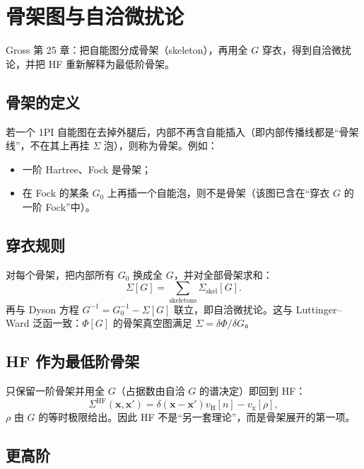 \section{骨架图与自洽微扰论}

Gross 第 25 章：把自能图分成骨架（skeleton），再用全 $G$ 穿衣，得到自洽微扰论，并把 HF 重新解释为最低阶骨架。

\subsection{骨架的定义}

若一个 1PI 自能图在去掉外腿后，内部不再含自能插入（即内部传播线都是“骨架线”，不在其上再挂 $\Sigma$ 泡），则称为骨架。例如：
\begin{itemize}
  \item 一阶 Hartree、Fock 是骨架；
  \item 在 Fock 的某条 $G_0$ 上再插一个自能泡，则不是骨架（该图已含在“穿衣 $G$ 的一阶 Fock”中）。
\end{itemize}

\subsection{穿衣规则}

对每个骨架，把内部所有 $G_0$ 换成全 $G$，并对全部骨架求和：
\begin{equation}
  \Sigma[G]
  =\sum_{\text{skeletons}}
  \Sigma_{\mathrm{skel}}[G].
\label{eq:skeleton}
\end{equation}
再与 Dyson 方程 $G^{-1}=G_0^{-1}-\Sigma[G]$ 联立，即自洽微扰论。这与 Luttinger--Ward 泛函一致：$\Phi[G]$ 的骨架真空图满足 $\Sigma=\delta\Phi/\delta G$。

\subsection{HF 作为最低阶骨架}

只保留一阶骨架并用全 $G$（占据数由自洽 $G$ 的谱决定）即回到 HF：
\begin{equation}
  \Sigma^{\mathrm{HF}}(\mathbf{x},\mathbf{x}')
  =\delta(\mathbf{x}-\mathbf{x}')v_{\mathrm{H}}[n]
  -v_{\mathrm{x}}[\rho],
\end{equation}
$\rho$ 由 $G$ 的等时极限给出。因此 HF 不是“另一套理论”，而是骨架展开的第一项。

\subsection{更高阶}

